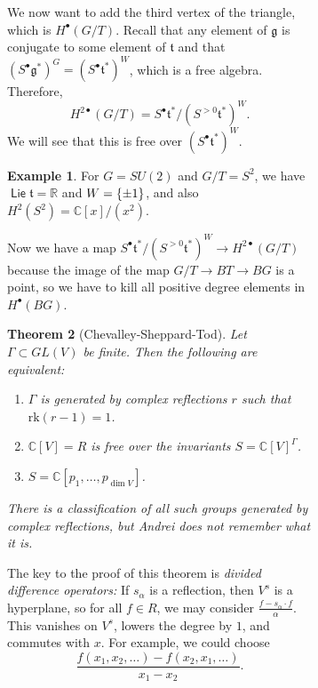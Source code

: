 \documentclass[leqno, openany]{memoir}
\newtheorem{thm}{Theorem}[section]
\theoremstyle{definition}
\newtheorem{exm}[thm]{Example}
\theoremstyle{remark}
\theoremstyle{plain}
\theoremstyle{definition}
\theoremstyle{remark}
\newcommand{\R}{\mathbb{R}}
\newcommand{\C}{\mathbb{C}}
\newcommand{\mf}[1]{\mathfrak{#1}}
\newcommand{\mr}[1]{\mathrm{#1}}
\DeclareMathOperator{\Lie}{\mathsf{Lie}}
\begin{document}
\begin{figure}[H]
\begin{figure}[H]
We now want to add the third vertex of the triangle, which is
$H^{\bullet}(G/T)$. Recall that any element of $\mf{g}$ is conjugate to some
element of $\mf{t}$ and that ${(S^{\bullet} \mf{g}^*)}^G = {(S^{\bullet}
\mf{t}^*)}^W$, which is a free algebra. Therefore, \[ H^{2\bullet}(G/T) =
S^{\bullet} \mf{t^*} / {(S^{>0} \mf{t}^*)}^W. \] We will see that this is free
over ${(S^{\bullet} \mf{t}^*)}^W$.  \begin{exm} For $G = SU(2)$ and $G/T =
    S^2$, we have $\Lie \mf{t} = \R$ and $W = \qty{\pm 1}$, and also $H^2(S^2)
    = \C[x] / (x^2)$.  \end{exm}

Now we have a map $S^{\bullet} \mf{t}^* / {(S^{>0} \mf{t}^*)}^W \to H^{2
\bullet}(G/T)$ because the image of the map $G/T \to BT \to BG$ is a point, so
we have to kill all positive degree elements in $H^{\bullet}(BG)$.

\begin{thm}[Chevalley-Sheppard-Tod] Let $\Gamma \subset GL(V)$ be finite. Then
    the following are equivalent: \begin{enumerate} \item $\Gamma$ is generated
        by complex reflections $r$ such that $\mr{rk}(r-1) = 1$.  \item $\C[V]
        = R$ is free over the invariants $S = {\C[V]}^{\Gamma}$.  \item $S =
\C[p_1, \ldots, p_{\dim V}]$.  \end{enumerate} There is a classification of all
such groups generated by complex reflections, but Andrei does not remember what
it is.  \end{thm}

The key to the proof of this theorem is \textit{divided difference operators:}
If $s_{\alpha}$ is a reflection, then $V^s$ is a hyperplane, so for all $f \in
R$, we may consider $\frac{ f - s_{\alpha} \cdot f }{\alpha}$. This vanishes on
$V^s$, lowers the degree by $1$, and commutes with $x$. For example, we could
choose \[ \frac{f(x_1, x_2, \ldots) - f(x_2, x_1, \ldots)}{x_1 - x_2}. \]


\end{figure}
\end{figure}
\end{document}
